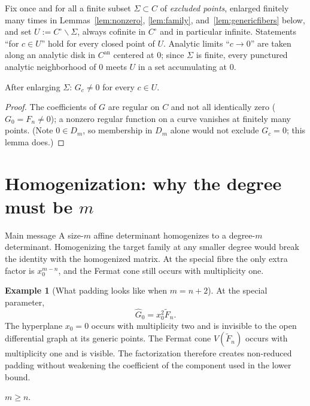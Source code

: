 \documentclass[acmsmall,screen,nonacm]{acmart}
\theoremstyle{definition}
\newtheorem{example}{Example}[section]
\theoremstyle{remark}
\begin{document}
Fix once and for all a finite subset $\Sigma\subset C$ of
\emph{excluded points}, enlarged finitely many times in
Lemmas~\ref{lem:nonzero}, \ref{lem:family},
and~\ref{lem:genericfibers} below, and set
$U:=C^\circ\smallsetminus\Sigma$, always cofinite in $C^\circ$ and in
particular infinite.  Statements ``for $c\in U$'' hold for every
closed point of $U$.  Analytic limits ``$c\to0$'' are taken along an
analytic disk in $C^{\mathrm{an}}$ centered at $0$; since $\Sigma$ is
finite, every punctured analytic neighborhood of $0$ meets $U$ in a
set accumulating at $0$.

\begin{lemma}\label{lem:nonzero}
After enlarging $\Sigma$: $G_c\ne0$ for every $c\in U$.
\end{lemma}

\begin{proof}
The coefficients of $G$ are regular on $C$ and not all identically
zero ($G_0=F_n\ne0$); a nonzero regular function on a curve vanishes
at finitely many points.  (Note $0\in D_m$, so membership in $D_m$
alone would not exclude $G_c=0$; this lemma does.)
\end{proof}

\section{Homogenization: why the degree must be $m$}\label{sec:homog}

\begin{readerbox}{Main message}
A size-$m$ affine determinant homogenizes to a degree-$m$ determinant.  Homogenizing the target family at any smaller degree would break the identity with the homogenized matrix.  At the special fibre the only extra factor is $x_0^{m-n}$, and the Fermat cone still occurs with multiplicity one.
\end{readerbox}

\begin{example}[What padding looks like when $m=n+2$]
At the special parameter,
\[
  \widehat G_0=x_0^2\widetilde F_n.
\]
The hyperplane $x_0=0$ occurs with multiplicity two and is invisible to the
open differential graph at its generic points.  The Fermat cone
$V(\widetilde F_n)$ occurs with multiplicity one and is visible.  The
factorization therefore creates non-reduced padding without weakening the
coefficient of the component used in the lower bound.
\end{example}

\begin{lemma}\label{lem:mgen}
$m\ge n$.
\end{lemma}
\end{document}
